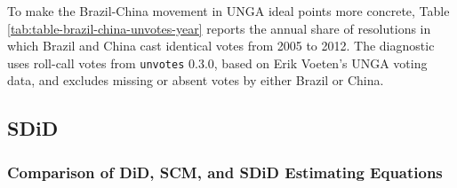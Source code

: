 \documentclass[referee,pdflatex,sn-basic]{sn-jnl}
\renewenvironment{table}[1][]{\tableorg[#1]}{\endtableorg\normalfont}
\theoremstyle{thmstylethree}
\begin{document}
To make the Brazil-China movement in UNGA ideal points more concrete, Table \ref{tab:table-brazil-china-unvotes-year} reports the annual share of resolutions in which Brazil and China cast identical votes from 2005 to 2012. The diagnostic uses roll-call votes from \texttt{unvotes} 0.3.0, based on Erik Voeten's UNGA voting data, and excludes missing or absent votes by either Brazil or China.

\begin{table}[H]
\centering
\caption{\label{tab:table-brazil-china-unvotes-year}Brazil-China identical UNGA votes by year, 2005-2012.}
\centering
{}
\end{table}

\clearpage

\subsection*{SDiD}\label{sdid}

\subsubsection{Comparison of DiD, SCM, and SDiD Estimating Equations}\label{comparison-of-did-scm-and-sdid-estimating-equations}
\end{document}
